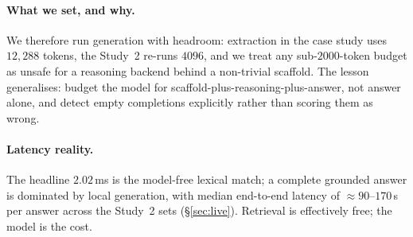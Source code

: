 \documentclass[10pt,twocolumn]{article}
\begin{document}
\paragraph{What we set, and why.} We therefore run generation with headroom: extraction in the case study uses $12{,}288$ tokens, the Study~2 re-runs $4096$, and we treat any sub-$2000$-token budget as unsafe for a reasoning backend behind a non-trivial scaffold. The lesson generalises: budget the model for scaffold-plus-reasoning-plus-answer, not answer alone, and detect empty completions explicitly rather than scoring them as wrong.

\paragraph{Latency reality.} The headline $2.02$\,ms is the model-free lexical match; a complete grounded answer is dominated by local generation, with median end-to-end latency of $\approx90$--$170$\,s per answer across the Study~2 sets (\S\ref{sec:live}). Retrieval is effectively free; the model is the cost.
\end{document}
